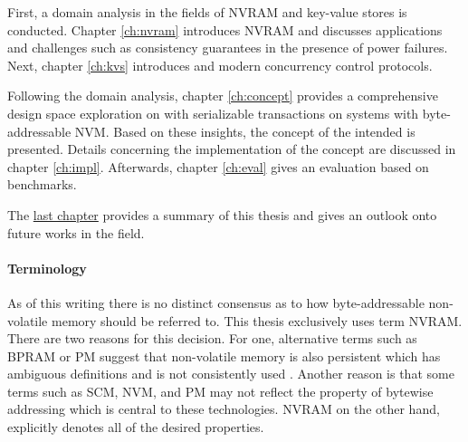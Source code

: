 First, a domain analysis in the fields of \ac{NVRAM} and key-value stores is
conducted. Chapter \ref{ch:nvram} introduces \ac{NVRAM} and discusses
applications and challenges such as consistency guarantees in the presence of
power failures. Next, chapter \ref{ch:kvs} introduces \kvsp and modern
concurrency control protocols.

Following the domain analysis, chapter \ref{ch:concept} provides a comprehensive
design space exploration on \kvsp with serializable transactions on systems with
byte-addressable \ac{NVM}. Based on these insights, the concept of the intended
\kvs is presented. Details concerning the implementation of the concept are
discussed in chapter \ref{ch:impl}. Afterwards, chapter \ref{ch:eval} gives an
evaluation based on benchmarks.

The \hyperref[ch:summary]{last chapter} provides a summary of this thesis and
gives an outlook onto future works in the field.

\paragraph{Terminology}

As of this writing there is no distinct consensus as to how byte-addressable
non-volatile memory should be referred to. This thesis exclusively uses term
\ac{NVRAM}. There are two reasons for this decision. For one, alternative terms
such as \ac{BPRAM} or \ac{PM} suggest that non-volatile memory is also
persistent which has ambiguous definitions and is not consistently used
\cite{volos2017whisper}. Another reason is that some terms such as \ac{SCM},
\ac{NVM}, and \ac{PM} may not reflect the property of bytewise addressing which
is central to these technologies. \ac{NVRAM} on the other hand, explicitly
denotes all of the desired properties.
